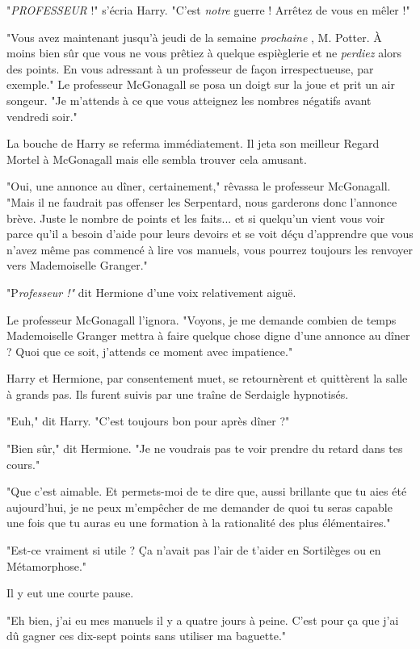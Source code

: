 "\emph{PROFESSEUR}  !" s'écria Harry. "C'est \emph{notre}  guerre ! Arrêtez de vous en mêler !"

"Vous avez maintenant jusqu'à jeudi de la semaine \emph{prochaine} , M. Potter. À moins bien sûr que vous ne vous prêtiez à quelque espièglerie et ne \emph{perdiez}  alors des points. En vous adressant à un professeur de façon irrespectueuse, par exemple." Le professeur McGonagall se posa un doigt sur la joue et prit un air songeur. "Je m'attends à ce que vous atteignez les nombres négatifs avant vendredi soir."

La bouche de Harry se referma immédiatement. Il jeta son meilleur Regard Mortel à McGonagall mais elle sembla trouver cela amusant.

"Oui, une annonce au dîner, certainement," rêvassa le professeur McGonagall. "Mais il ne faudrait pas offenser les Serpentard, nous garderons donc l'annonce brève. Juste le nombre de points et les faits... et si quelqu'un vient vous voir parce qu'il a besoin d'aide pour leurs devoirs et se voit déçu d'apprendre que vous n'avez même pas commencé à lire vos manuels, vous pourrez toujours les renvoyer vers Mademoiselle Granger."

"P\emph{rofesseur !"}  dit Hermione d'une voix relativement aiguë.

Le professeur McGonagall l'ignora. "Voyons, je me demande combien de temps Mademoiselle Granger mettra à faire quelque chose digne d'une annonce au dîner ? Quoi que ce soit, j'attends ce moment avec impatience."

Harry et Hermione, par consentement muet, se retournèrent et quittèrent la salle à grands pas. Ils furent suivis par une traîne de Serdaigle hypnotisés.

"Euh," dit Harry. "C'est toujours bon pour après dîner ?"

"Bien sûr," dit Hermione. "Je ne voudrais pas te voir prendre du retard dans tes cours."

"Que c'est aimable. Et permets-moi de te dire que, aussi brillante que tu aies été aujourd'hui, je ne peux m'empêcher de me demander de quoi tu seras capable une fois que tu auras eu une formation à la rationalité des plus élémentaires."

"Est-ce vraiment si utile ? Ça n'avait pas l'air de t'aider en Sortilèges ou en Métamorphose."

Il y eut une courte pause.

"Eh bien, j'ai eu mes manuels il y a quatre jours à peine. C'est pour ça que j'ai dû gagner ces dix-sept points sans utiliser ma baguette."

